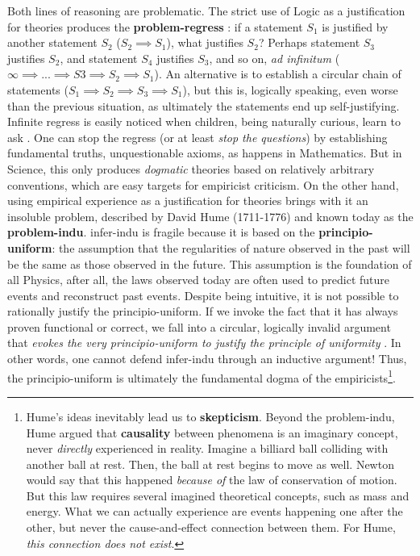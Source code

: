 \documentclass[./main_en.tex]{subfiles}
\begin{document}
\par Both lines of reasoning are problematic. The strict use of Logic as a justification for theories produces the \textbf{\gls{problem-regress}} \cite{cling2008}: if a statement $S_1$ is justified by another statement $S_2$ ($S_2 \implies S_1$), what justifies $S_2$? Perhaps statement $S_3$ justifies $S_2$, and statement $S_4$ justifies $S_3$, and so on, \textit{ad infinitum} ($\infty \implies ... \implies S3 \implies S_2 \implies S_1$). An alternative is to establish a circular chain of statements ($S_1 \implies S_2 \implies S_3 \implies S_1$), but this is, logically speaking, even worse than the previous situation, as ultimately the statements end up self-justifying. Infinite regress is easily noticed when children, being naturally curious, learn to ask . One can stop the regress (or at least \textit{stop the questions}) by establishing fundamental truths, unquestionable axioms, as happens in Mathematics. But in Science, this only produces \textit{dogmatic} theories based on relatively arbitrary conventions, which are easy targets for empiricist criticism. On the other hand, using empirical experience as a justification for theories brings with it an insoluble problem, described by David Hume (1711-1776) and known today as the \textbf{\gls{problem-indu}}. \gls{infer-indu} is fragile because it is based on the \textbf{\gls{principio-uniform}}: the assumption that the regularities of nature observed in the past will be the same as those observed in the future. This assumption is the foundation of all Physics, after all, the laws observed today are often used to predict future events and reconstruct past events. Despite being intuitive, it is not possible to rationally justify the \gls{principio-uniform}. If we invoke the fact that it has always proven functional or correct, we fall into a circular, logically invalid argument that \textit{evokes the very \gls{principio-uniform} to justify the principle of uniformity} \cite{sep-induction-problem}. In other words, one cannot defend \gls{infer-indu} through an inductive argument! Thus, the \gls{principio-uniform} is ultimately the fundamental dogma of the empiricists\footnote{Hume's ideas inevitably lead us to \textbf{skepticism}. Beyond the \gls{problem-indu}, Hume argued that \textbf{causality} between phenomena is an imaginary concept, never \textit{directly} experienced in reality. Imagine a billiard ball colliding with another ball at rest. Then, the ball at rest begins to move as well. Newton would say that this happened \textit{because of} the law of conservation of motion. But this law requires several imagined theoretical concepts, such as mass and energy. What we can actually experience are events happening one after the other, but never the cause-and-effect connection between them. For Hume, \textit{this connection does not exist}.}.
    
\end{document}
